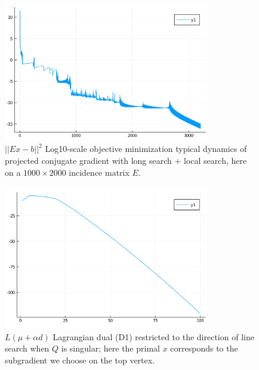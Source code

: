 \documentclass[10pt,twoside,book,a5paper]{ncc}
\begin{document}
\begin{figure}[ht]
\centering
\includegraphics[width=0.80\textwidth]{PCG}
\caption{$||E x - b||^2$ Log10-scale objective minimization typical dynamics of projected conjugate gradient with long search + local search, here on a $1000\times 2000$ incidence matrix $E$.}
\label{fig:PCG}
\end{figure}
\begin{figure}[ht]
\centering
\includegraphics[width=0.80\textwidth]{LineSearch}
\caption{$L(\mu+\alpha d)$ Lagrangian dual (D1) restricted to the direction of line search when $Q$ is singular; here the primal $x$ corresponds to the subgradient we choose on the top vertex.}
\label{fig:LineSearch}
\end{figure}

\end{document}
